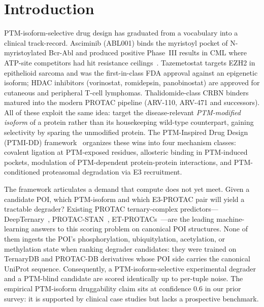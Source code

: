 \section{Introduction}
\label{sec:intro}

PTM-isoform-selective drug design has graduated from a vocabulary into a clinical track-record. Asciminib (ABL001) binds the myristoyl pocket of N-myristoylated Bcr-Abl and produced positive Phase~III results in CML where ATP-site competitors had hit resistance ceilings~\cite{ptmi-dd-meng2021}. Tazemetostat targets EZH2 in epithelioid sarcoma and was the first-in-class FDA approval against an epigenetic isoform; HDAC inhibitors (vorinostat, romidepsin, panobinostat) are approved for cutaneous and peripheral T-cell lymphomas. Thalidomide-class CRBN binders matured into the modern PROTAC pipeline (ARV-110, ARV-471 and successors). All of these exploit the same idea: target the disease-relevant \emph{PTM-modified isoform} of a protein rather than its housekeeping wild-type counterpart, gaining selectivity by sparing the unmodified protein. The PTM-Inspired Drug Design (PTMI-DD) framework~\cite{ptmi-dd-meng2021} organizes these wins into four mechanism classes: covalent ligation at PTM-exposed residues, allosteric binding in PTM-induced pockets, modulation of PTM-dependent protein-protein interactions, and PTM-conditioned proteasomal degradation via E3 recruitment.

The framework articulates a demand that compute does not yet meet. Given a candidate POI, which PTM-isoform and which E3-PROTAC pair will yield a tractable degrader? Existing PROTAC ternary-complex predictors---DeepTernary~\cite{deepternary-2025}, PROTAC-STAN~\cite{protac-stan-2025}, ET-PROTACs~\cite{et-protacs-2024}---are the leading machine-learning answers to this scoring problem on canonical POI structures. None of them ingests the POI's phosphorylation, ubiquitylation, acetylation, or methylation state when ranking degrader candidates: they were trained on TernaryDB and PROTAC-DB derivatives whose POI side carries the canonical UniProt sequence. Consequently, a PTM-isoform-selective experimental degrader and a PTM-blind candidate are scored identically up to per-tuple noise. The empirical PTM-isoform druggability claim sits at confidence $0.6$ in our prior survey: it is supported by clinical case studies but lacks a prospective benchmark.

